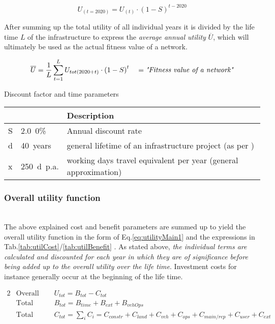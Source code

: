 \begin{equation}
	\label{eq:discount}
	U_{(t=2020)} = U_{(t)}\cdot \left(1-S\right)^{t-2020}
\end{equation}

After summing up the total utility of all individual years it is divided by the life time $L$ of the infrastructure to express the \textit{average annual utility} $\overline{U}$, which will ultimately be used as the actual fitness value of a network.

\begin{equation}
	\label{eq:averageAnnualUtility}
	\overline{U} = \frac{1}{L}\sum_{t=1}^{L} U_{tot(2020+t)}\cdot \left(1-S\right)^{t} \quad = \emph{"Fitness value of a network"}
\end{equation}


%
{Discount factor and time parameters}%
{\label{tab:timeParameters}}%
{%
	\begin{tabular}{L | L | l}
		\toprule
		 &  & Description \\ \hline
		S & 2.0~0\% & Annual discount rate \citet{VSS_Norm_641820_2006Own} \\
		d & 40~years & general lifetime of an infrastructure project (as per \citet{VSS_Norm_641820_2006Own})\\
		x & 250~d~p.a. & working days travel equivalent per year (general approximation) \\
		\bottomrule
	\end{tabular}
}%
{}


\subsubsection{Overall utility function}\label{subch:evoUtilityEq}\mbox{}\\
The above explained cost and benefit parameters are summed up to yield the overall utility function in the form of Eq.\ref{eq:utilityMain1} and the expressions in Tab.\ref{tab:utilCost}/\ref{tab:utilBenefit} . As stated above, \emph{the individual terms are calculated and discounted for each year in which they are of significance before being added up to the overall utility over the life time}. Investment costs for instance generally occur at the beginning of the life time.

\begin{alignat}{2}
&\text{Overall Utility:   }  &&U_{tot} = B_{tot} - C_{tot}  \label{eq:utilityMain1} \\
&\text{Total Benefit:     }  &&B_{tot} = B_{time} + B_{ext} + B_{vehOps}  \label{eq:utilityMain2} \\
&\text{Total Cost:        }  &&C_{tot} = \sum_{i}C_i =  C_{constr} + C_{land} + C_{veh} + C_{ops} + C_{main/rep}  + C_{user} + C_{ext} \label{eq:utilityMain3}
\end{alignat}



